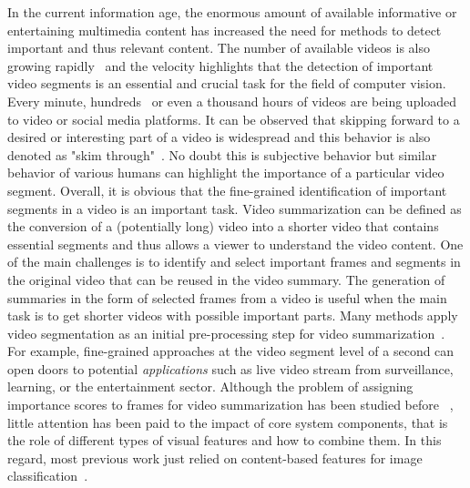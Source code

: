 \documentclass{article}
\begin{document}
In the current information age, the enormous amount of available informative or entertaining multimedia content has increased the need for methods to detect important and thus relevant content. The number of available videos is also growing rapidly~\cite{DBLP:conf/cvpr/SongVSJ15,DBLP:conf/eccv/ZhangCSG16} and the velocity highlights that the detection of important video segments is an essential and crucial task for the field of computer vision. Every minute, hundreds~\cite{DBLP:conf/eccv/ZhangCSG16,DBLP:conf/eccv/ZhangGS18} or even a thousand hours of videos are being uploaded to video or social media platforms. 
It can be observed that skipping forward to a desired or interesting part of a video is widespread and this behavior is also denoted as "skim through"~\cite{DBLP:conf/eccv/PotapovDHS14}.
No doubt this is subjective behavior but similar behavior of various humans can highlight the importance of a particular video segment. Overall, it is obvious that the fine-grained identification of important segments in a video is an important task.
Video summarization can be defined as the conversion of a (potentially long) video into a shorter video that contains essential segments and thus allows a viewer to understand the video content. 
One of the main challenges is to identify and select important frames and segments in the original video that can be reused in the video summary.
The generation of summaries in the form of selected frames from a video is useful when the main task is to get shorter videos with possible important parts. 
Many methods apply video segmentation as an initial pre-processing step for video summarization~\cite{DBLP:conf/cvpr/SongVSJ15,DBLP:conf/eccv/ZhangCSG16,DBLP:conf/eccv/GygliGRG14,DBLP:conf/mm/Wang000FT19}. 
For example, fine-grained approaches at the video segment level of a second can open doors to potential  \emph{applications} such as live video stream from surveillance, learning, or the entertainment sector. 
Although the problem of assigning importance scores to frames for video summarization has been studied before ~\cite{DBLP:conf/eccv/ZhangCSG16,DBLP:conf/eccv/GygliGRG14, DBLP:conf/mm/Wang000FT19,DBLP:conf/eccv/PotapovDHS14,DBLP:conf/nips/ShiCWYWW15, DBLP:conf/nips/GongCGS14}, little attention has been paid to the impact of core system components, that is the role of different types of visual features and how to combine them. In this regard, most previous work just relied on content-based features for image classification~\cite{DBLP:conf/eccv/ZhangGS18,DBLP:journals/corr/abs-2006-01410,DBLP:conf/accv/FajtlSAMR18,DBLP:journals/corr/abs-1708-09545,DBLP:conf/mm/FengLKZ18}. 
\end{document}
